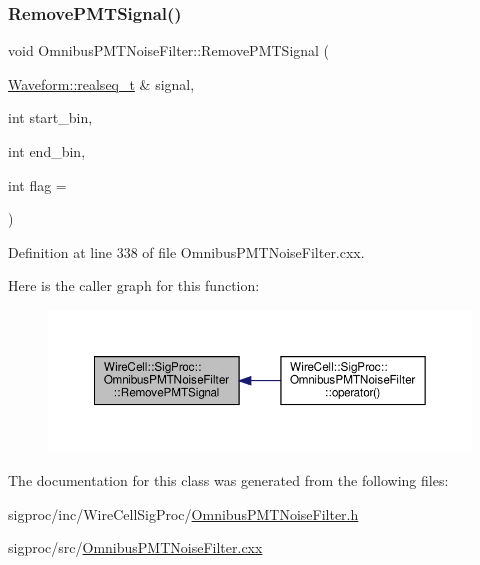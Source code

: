 \subsubsection{\texorpdfstring{Remove\+P\+M\+T\+Signal()}{RemovePMTSignal()}}
{\footnotesize\ttfamily void Omnibus\+P\+M\+T\+Noise\+Filter\+::\+Remove\+P\+M\+T\+Signal (\begin{DoxyParamCaption}\item[{\hyperlink{namespace_wire_cell_1_1_waveform_a479175e541c8545e87cd8063b74b6956}{Waveform\+::realseq\+\_\+t} \&}]{signal,  }\item[{int}]{start\+\_\+bin,  }\item[{int}]{end\+\_\+bin,  }\item[{int}]{flag = {} }\end{DoxyParamCaption})}



Definition at line 338 of file Omnibus\+P\+M\+T\+Noise\+Filter.\+cxx.

Here is the caller graph for this function\+:
\nopagebreak
\begin{figure}[H]
\begin{center}
\leavevmode
\includegraphics[width=350pt]{class_wire_cell_1_1_sig_proc_1_1_omnibus_p_m_t_noise_filter_a5d53fbe0bbc137cfc1e432b957fbb696_icgraph}
\end{center}
\end{figure}


The documentation for this class was generated from the following files\+:\begin{DoxyCompactItemize}
\item 
sigproc/inc/\+Wire\+Cell\+Sig\+Proc/\hyperlink{_omnibus_p_m_t_noise_filter_8h}{Omnibus\+P\+M\+T\+Noise\+Filter.\+h}\item 
sigproc/src/\hyperlink{_omnibus_p_m_t_noise_filter_8cxx}{Omnibus\+P\+M\+T\+Noise\+Filter.\+cxx}\end{DoxyCompactItemize}
